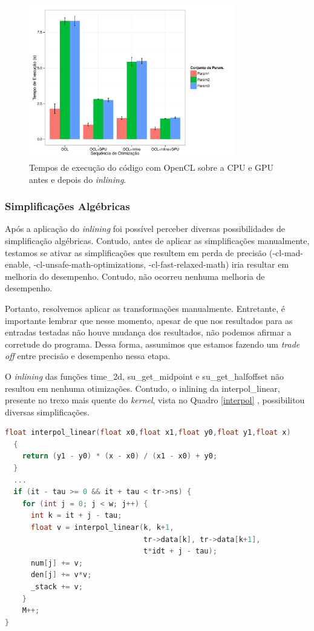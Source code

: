 \documentclass[12pt]{article}
\begin{document}
\begin{figure}[H]
\centering
\includegraphics[width=0.8\textwidth]{oclinline.pdf}
\caption{Tempos de execução do código com OpenCL sobre a CPU e GPU antes e depois do \textit{inlining}.}
\label{fgcinline}
\end{figure}


\subsubsection{Simplificações Algébricas}

Após a aplicação do \textit{inlining} foi possível perceber diversas possibilidades de simplificação algébricas. Contudo, antes de aplicar as simplificações manualmente, testamos se ativar as simplificações que resultem em perda de precisão (-cl-mad-enable, -cl-unsafe-math-optimizations, -cl-fast-relaxed-math) iria resultar em melhoria do desempenho. Contudo, não ocorreu nenhuma melhoria de desempenho.

Portanto, resolvemos aplicar as transformações manualmente. Entretante, é importante lembrar que nesse momento, apesar de que nos resultados para as entradas testadas não houve mudança dos resultados, não podemos afirmar a corretude do programa. Dessa forma, assumimos que estamos fazendo um \textit{trade off} entre precisão e desempenho nessa etapa. 

O \textit{inlining} das funções time\_2d, su\_get\_midpoint e su\_get\_halfoffset não resultou em nenhuma otimizações. Contudo, o inlining da interpol\_linear, presente no trexo mais quente do \textit{kernel}, vista no Quadro \ref{interpol} , possibilitou diversas simplificações. \\

\begin{lstlisting}[language=c, caption=Trexo de chamada da função interpol\_linear antes do \textit{inlining}., label=interpol]
  float interpol_linear(float x0,float x1,float y0,float y1,float x)
  {
    return (y1 - y0) * (x - x0) / (x1 - x0) + y0;
  }
  ...
  if (it - tau >= 0 && it + tau < tr->ns) {
    for (int j = 0; j < w; j++) {
      int k = it + j - tau;
      float v = interpol_linear(k, k+1,
                                tr->data[k], tr->data[k+1],
                                t*idt + j - tau);
      num[j] += v;
      den[j] += v*v;
      _stack += v;
    }
    M++;
}
\end{lstlisting}
\end{document}
